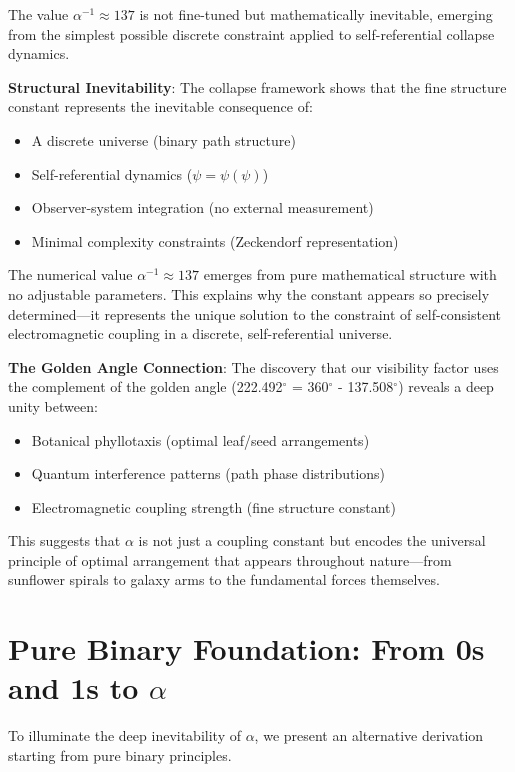 \documentclass[%
 reprint,
 amsmath,amssymb,
 aps,
 prd,
 10pt,
 nofootinbib,      %
 longbibliography  %
]{revtex4-2}
\theoremstyle{definition}
\theoremstyle{remark}
\begin{document}
The value $\alpha^{-1} \approx 137$ is not fine-tuned but mathematically inevitable, emerging from the simplest possible discrete constraint applied to self-referential collapse dynamics.

\textbf{Structural Inevitability}: The collapse framework shows that the fine structure constant represents the inevitable consequence of:
\begin{itemize}
\item A discrete universe (binary path structure)
\item Self-referential dynamics ($\psi = \psi(\psi)$)
\item Observer-system integration (no external measurement)
\item Minimal complexity constraints (Zeckendorf representation)
\end{itemize}

The numerical value $\alpha^{-1} \approx 137$ emerges from pure mathematical structure with no adjustable parameters. This explains why the constant appears so precisely determined—it represents the unique solution to the constraint of self-consistent electromagnetic coupling in a discrete, self-referential universe.

\textbf{The Golden Angle Connection}: The discovery that our visibility factor uses the complement of the golden angle (222.492$^\circ$ = 360$^\circ$ - 137.508$^\circ$) reveals a deep unity between:
\begin{itemize}
\item Botanical phyllotaxis (optimal leaf/seed arrangements)
\item Quantum interference patterns (path phase distributions)
\item Electromagnetic coupling strength (fine structure constant)
\end{itemize}

This suggests that $\alpha$ is not just a coupling constant but encodes the universal principle of optimal arrangement that appears throughout nature—from sunflower spirals to galaxy arms to the fundamental forces themselves.

\section{Pure Binary Foundation: From 0s and 1s to \texorpdfstring{$\alpha$}{alpha}}\label{sec:binary}

To illuminate the deep inevitability of $\alpha$, we present an alternative derivation starting from pure binary principles.
\end{document}
